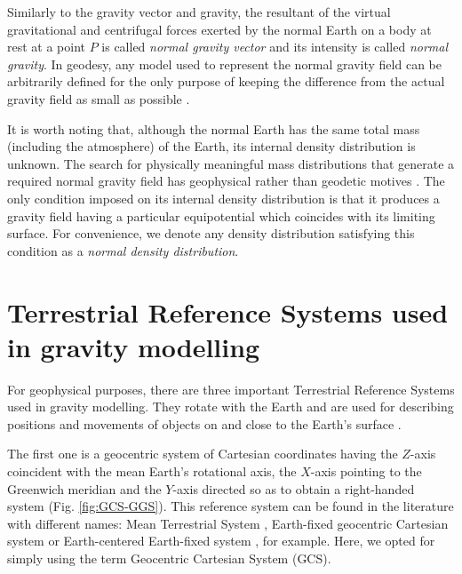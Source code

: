 \documentclass[extra]{gji}
\begin{document}
Similarly to the gravity vector and gravity,
the resultant of the virtual
gravitational and centrifugal forces exerted by the normal
Earth on a body at rest at a point $P$ is called
\textit{normal gravity vector} and its intensity is called
\textit{normal gravity}.
In geodesy, any model used to represent the normal gravity field
can be arbitrarily defined for the only purpose
of keeping the difference from the actual gravity field as small
as possible \citep{vanicek1987}.

It is worth noting that, although the normal Earth has the
same total mass (including the atmosphere) of the Earth,
its internal density distribution is unknown.
The search for physically meaningful mass distributions
that generate a required normal gravity field
has geophysical rather than geodetic motives \citep{marussi1974}.
The only condition imposed on its internal density
distribution is that it produces a gravity field
having a particular equipotential which coincides
with its limiting surface.
For convenience, we denote any density distribution
satisfying this condition as a \textit{normal density distribution}.


\section{Terrestrial Reference Systems used in gravity modelling}

For geophysical purposes, there are three important Terrestrial Reference Systems used in gravity modelling.
They rotate with the Earth and are used for describing
positions and movements of objects on and close to the Earth’s surface
\citep{torge2012}.

The first one is a geocentric system of Cartesian coordinates having
the $Z$-axis coincident with the mean Earth's rotational axis,
the $X$-axis pointing to the Greenwich meridian and the $Y$-axis
directed so as to obtain a right-handed system (Fig. \ref{fig:GCS-GGS}).
This reference system can be found in the literature with different names: Mean Terrestrial System \citep[e.g.,][]{soler1976}, Earth-fixed geocentric Cartesian system \citep[e.g.,][]{torge2012}
or Earth-centered Earth-fixed system \citep[e.g.,][]{bouman_etal2013}, for example. Here, we opted for simply using the term Geocentric Cartesian System (GCS).
\end{document}
